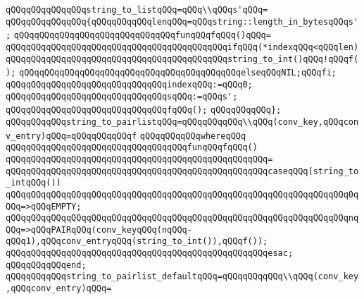 \newline
\verb|qQQqqQQqqQQqqQQqstring_to_listqQQq=qQQq\\qQQqs'qQQq=|\newline
\verb|qQQqqQQqqQQqqQQq{qQQqqQQqqQQqlenqQQq=qQQqstring::length_in_bytesqQQqs';|\newline
\verb|qQQqqQQqqQQqqQQqqQQqqQQqqQQqqQQqfunqQQqfqQQq()qQQq=|\newline
\verb|qQQqqQQqqQQqqQQqqQQqqQQqqQQqqQQqqQQqqQQqqQQqifqQQq(*indexqQQq<qQQqlen)|\newline
\verb|qQQqqQQqqQQqqQQqqQQqqQQqqQQqqQQqqQQqqQQqqQQqstring_to_int()qQQq!qQQqf();|\newline
\verb|qQQqqQQqqQQqqQQqqQQqqQQqqQQqqQQqqQQqqQQqqQQqelseqQQqNIL;qQQqfi;|\newline
\verb|qQQqqQQqqQQqqQQqqQQqqQQqqQQqqQQqindexqQQq:=qQQq0;|\newline
\verb|qQQqqQQqqQQqqQQqqQQqqQQqqQQqqQQqsqQQq:=qQQqs';|\newline
\verb|qQQqqQQqqQQqqQQqqQQqqQQqqQQqqQQqfqQQq();|\newline
\verb|qQQqqQQqqQQq};|\newline
\newline
\verb|qQQqqQQqqQQqstring_to_pairlistqQQq=qQQqqQQqqQQq\\qQQq(conv_key,qQQqconv_entry)qQQq=qQQqqQQqqQQqf|\newline
\verb|qQQqqQQqqQQqwhereqQQq|\newline
\verb|qQQqqQQqqQQqqQQqqQQqqQQqqQQqqQQqqQQqfunqQQqfqQQq()|\newline
\verb|qQQqqQQqqQQqqQQqqQQqqQQqqQQqqQQqqQQqqQQqqQQqqQQqqQQq=|\newline
\verb|qQQqqQQqqQQqqQQqqQQqqQQqqQQqqQQqqQQqqQQqqQQqqQQqqQQqcaseqQQq(string_to_intqQQq())|\newline
\verb|qQQqqQQqqQQqqQQqqQQqqQQqqQQqqQQqqQQqqQQqqQQqqQQqqQQqqQQqqQQqqQQqqQQq0qQQq=>qQQqEMPTY;|\newline
\verb|qQQqqQQqqQQqqQQqqQQqqQQqqQQqqQQqqQQqqQQqqQQqqQQqqQQqqQQqqQQqqQQqqQQqnqQQq=>qQQqPAIRqQQq(conv_keyqQQq(nqQQq-qQQq1),qQQqconv_entryqQQq(string_to_int()),qQQqf());|\newline
\verb|qQQqqQQqqQQqqQQqqQQqqQQqqQQqqQQqqQQqqQQqqQQqqQQqqQQqesac;|\newline
\verb|qQQqqQQqqQQqend;|\newline
\newline
\verb|qQQqqQQqqQQqstring_to_pairlist_defaultqQQq=qQQqqQQqqQQq\\qQQq(conv_key,qQQqconv_entry)qQQq=|\newline
